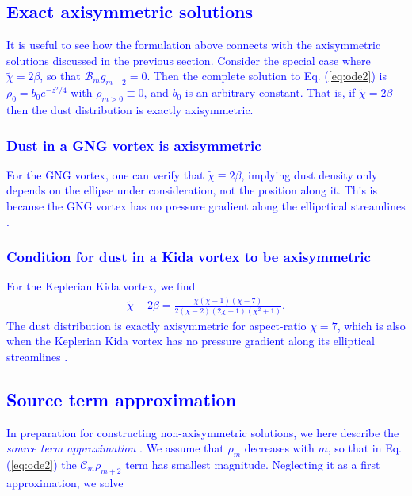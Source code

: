 \documentclass[apj]{emulateapj}
\def\blue#1{\textcolor{blue}{#1}}
\newcommand{\Eq}[1]{Eq. (\ref{#1})}
\newcommand{\eq}[1]{\Eq{#1}}
\newcommand{\tilchi}{\tilde\chi}
\begin{document}
\blue{
\subsection{Exact axisymmetric solutions}
It is useful to see how the formulation above connects with the  axisymmetric solutions discussed in the previous section.  Consider the special case where $\tilchi = 2\beta$, so that 
$\mathcal{B}_mg_{m-2} = 0.$
Then the complete solution to \eq{eq:ode2} is $\rho_0 = b_0e^{-z^2/4}$ with $\rho_{m>0} \equiv 0$, and $b_0$ is an arbitrary constant. That is, if $\tilchi=2\beta$ then the dust distribution is exactly axisymmetric. 
}
\blue{
\subsubsection{Dust in a GNG vortex is axisymmetric}
For the GNG vortex, one can verify that $\tilchi\equiv 2\beta$, implying dust density only depends on the ellipse under consideration, not the position along it. This is because the GNG vortex has no pressure gradient along the ellipctical streamlines \citep{Chang-Oishi10}. 
}
\blue{
\subsubsection{Condition for dust in a Kida vortex to be axisymmetric}
For the Keplerian Kida vortex, we find
\begin{align}
\tilchi - 2\beta = \frac{\chi(\chi-1)(\chi-7)}{2(\chi-2)(2\chi+1)(\chi^2+1)}.
\end{align}
The dust distribution is exactly axisymmetric for aspect-ratio $\chi=7$, which is also when the Keplerian Kida vortex has no pressure gradient along its elliptical streamlines \citep{Chang-Oishi10}. 
}
\blue{
\subsection{Source term approximation}
In preparation for constructing non-axisymmetric solutions, we here describe the \emph{source term approximation} \citep{Zhang06}.
We assume that $\rho_m$ decreases with $m$, so that in \eq{eq:ode2} the $\mathcal{C}_m\rho_{m+2}$ term has smallest magnitude.  Neglecting it as a first approximation, we solve 
}
\end{document}
